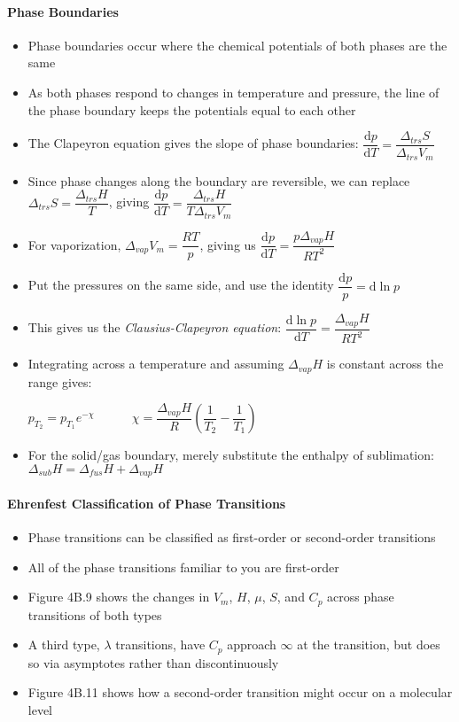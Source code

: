 \documentclass[12pt, openany, letterpaper]{memoir}
\begin{document}
\paragraph{Phase Boundaries}
\begin{itemize}
	\item Phase boundaries occur where the chemical potentials of both phases are the same
	\item As both phases respond to changes in temperature and pressure, the line of the phase boundary keeps the potentials equal to each other
	\item The Clapeyron equation gives the slope of phase boundaries: $\dfrac{\mathrm{d}p}{\mathrm{d}T}=\dfrac{\Delta_{trs}S}{\Delta_{trs}V_m}$
	\item Since phase changes along the boundary are reversible, we can replace $\Delta_{trs}S=\dfrac{\Delta_{trs}H}{T}$, giving $\dfrac{\mathrm{d}p}{\mathrm{d}T}= \dfrac{\Delta_{trs}H}{T\Delta_{trs}V_m}$
	\item For vaporization, $\Delta_{vap}V_m = \dfrac{RT}{p}$, giving us $\dfrac{\mathrm{d}p}{\mathrm{d}T}= \dfrac{p\Delta_{vap}H}{RT^2}$
	\item Put the pressures on the same side, and use the identity $\dfrac{\mathrm{d}p}{p}=\mathrm{d}\ln p$
	\item This gives us the \emph{Clausius-Clapeyron equation}: $\dfrac{\mathrm{d}\ln p}{\mathrm{d}T} =\dfrac{\Delta_{vap}H}{RT^2}$
	\item Integrating across a temperature and assuming $\Delta_{vap} H$ is constant across the range gives: 
	
	$p_{T_2} = p_{T_1}e^{-\chi} \hspace{3em} \chi = \dfrac{\Delta_{vap}H}{R}\left(\dfrac{1}{T_2}-\dfrac{1}{T_1}\right)$
	\item For the solid/gas boundary, merely substitute the enthalpy of sublimation: $\Delta_{sub}H = \Delta_{fus}H+\Delta_{vap}H$
\end{itemize}
\paragraph{Ehrenfest Classification of Phase Transitions}
\begin{itemize}
	\item Phase transitions can be classified as first-order or second-order transitions
	\item All of the phase transitions familiar to you are first-order
	\item Figure 4B.9 shows the changes in $V_m$, $H$, $\mu$, $S$, and $C_p$ across phase transitions of both types
	\item A third type, $\lambda$ transitions, have $C_p$ approach $\infty$ at the transition, but does so via asymptotes rather than discontinuously
	\item Figure 4B.11 shows how a second-order transition might occur on a molecular level
\end{itemize}
\end{document}
